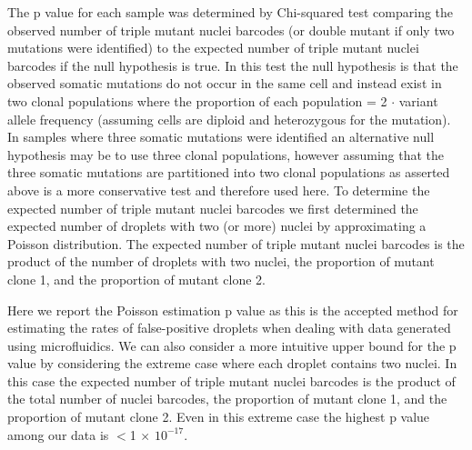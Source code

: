 The p value for each sample was determined by Chi-squared test comparing the observed number of triple mutant nuclei barcodes (or double mutant if only two mutations were identified) to the expected number of triple mutant nuclei barcodes if the null hypothesis is true. In this test the null hypothesis is that the observed somatic mutations do not occur in the same cell and instead exist in two clonal populations where the proportion of each population = 2 $\cdot$ variant allele frequency (assuming cells are diploid and heterozygous for the mutation). In samples where three somatic mutations were identified an alternative null hypothesis may be to use three clonal populations, however assuming that the three somatic mutations are partitioned into two clonal populations as asserted above is a more conservative test and therefore used here. To determine the expected number of triple mutant nuclei barcodes we first determined the expected number of droplets with two (or more) nuclei by approximating a Poisson distribution. The expected number of triple mutant nuclei barcodes is the product of the number of droplets with two nuclei, the proportion of mutant clone 1, and the proportion of mutant clone 2. 
	
Here we report the Poisson estimation p value as this is the accepted method for estimating the rates of false-positive droplets when dealing with data generated using microfluidics. We can also consider a more intuitive upper bound for the p value by considering the extreme case where each droplet contains two nuclei. In this case the expected number of triple mutant nuclei barcodes is the product of the total number of nuclei barcodes, the proportion of mutant clone 1, and the proportion of mutant clone 2. Even in this extreme case the highest p value among our data is $<$1 $\times$ $10^{-17}$. 

